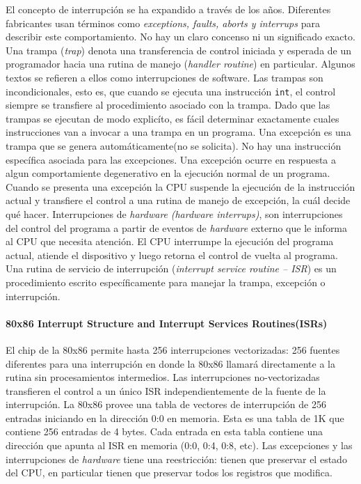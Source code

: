 El concepto de interrupción se ha expandido a través de los años. Diferentes fabricantes usan términos como \textit{exceptions, faults, aborts \textnormal{y} interrups} para describir este comportamiento. No hay un claro concenso ni un significado exacto.
Una trampa (\textit{trap}) denota una transferencia de control iniciada y esperada de un programador hacia una rutina de manejo (\textit{handler routine}) en particular. Algunos textos se refieren a ellos como interrupciones de software. Las trampas son incondicionales, esto es, que cuando se ejecuta una instrucción \texttt{int}, el control siempre se transfiere al procedimiento asociado con la trampa. Dado que las trampas se ejecutan de modo explicíto, es fácil determinar exactamente cuales instrucciones van a invocar a una trampa en un programa. Una excepción es una trampa que se genera automáticamente(no se solicita). No hay una instrucción específica asociada para las excepciones. Una excepción ocurre en respuesta a algun comportamiente degenerativo en la ejecución normal de un programa. Cuando se presenta una excepción la CPU suspende la ejecución de la instrucción actual y transfiere el control a una rutina de manejo de excepción, la cuál decide qué hacer. Interrupciones de \textit{hardware} \textit{(hardware interrups)}, son interrupciones del control del programa a partir de eventos de \textit{hardware} externo que le informa al CPU que necesita atención. El CPU interrumpe la ejecución del programa actual, atiende el dispositivo y luego retorna el control de vuelta al programa. Una rutina de servicio de interrupción (\textit{interrupt service routine -- ISR}) es un procedimiento escrito específicamente para manejar la trampa, excepción o interrupción.

\paragraph{\textnormal{\textbf{80x86 Interrupt Structure and Interrupt Services Routines(ISRs)}}}
El chip de la 80x86 permite hasta 256 interrupciones vectorizadas: 256 fuentes diferentes para una interrupción en donde la 80x86 llamará directamente a la rutina sin procesamientos intermedios. Las interrupciones no-vectorizadas transfieren el control a un único ISR independientemente de la fuente de la interrupción. La 80x86 provee una tabla de vectores de interrupción de 256 entradas iniciando en la dirección 0:0 en memoria. Esta es una tabla de 1K que contiene 256 entradas de 4 bytes. Cada entrada en esta tabla contiene una dirección que apunta al ISR en memoria (0:0, 0:4, 0:8, etc). Las excepciones y las interrupciones de \textit{hardware} tiene una reestricción: tienen que preservar el estado del CPU, en particular tienen que preservar todos los registros que modifica.

